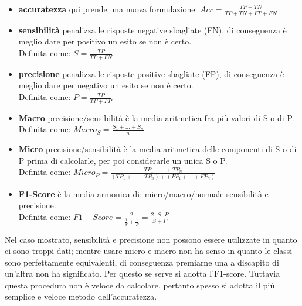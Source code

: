 \begin{itemize}
	\item \textbf{accuratezza} qui prende una nuova formulazione: $\displaystyle Acc = \frac{TP + TN}{TP + TN + FP + FN} $
	\item \textbf{sensibilità} penalizza le risposte negative sbagliate (FN), di conseguenza è meglio dare per positivo un esito se non è certo.\\
	Definita come: $\displaystyle S = \frac{TP}{TP + FN} $
	\item \textbf{precisione} penalizza le risposte positive sbagliate (FP), di conseguenza è meglio dare per negativo un esito se non è certo.\\
	Definita come: $\displaystyle P = \frac{TP}{TP + FP} $
	\item \textbf{Macro} precisione/sensibilità è la media aritmetica fra più valori di S o di P.\\
	Definita come: $\displaystyle Macro_{S} = \frac{S_1 + ... + S_n}{n} $
	\item \textbf{Micro} precisione/sensibilità è la media aritmetica delle componenti di S o di P prima di calcolarle, per poi considerarle un unica S o P.\\
	Definita come: $\displaystyle Micro_{P} = \frac{TP_1 + ... + TP_n }{ (TP_1 + ... + TP_n) + (FP_1 + ... + FP_n) } $
	\item \textbf{F1-Score} è la media armonica di: micro/macro/normale sensibilità e precisione.\\
	Definita come: $\displaystyle F1-Score = \frac{2}{ \frac{1}{S} + \frac{1}{P} } = \frac{2 \cdot S \cdot P}{ S + P }$
\end{itemize}
Nel caso mostrato, sensibilità e precisione non possono essere utilizzate in quanto ci sono troppi dati; mentre usare micro e macro non ha senso in quanto le classi sono perfettamente equivalenti, di conseguenza premiarne una a discapito di un'altra non ha significato. Per questo se serve si adotta l'F1-score. Tuttavia questa procedura non è veloce da calcolare, pertanto spesso si adotta il più semplice e veloce metodo dell'accuratezza.
%
